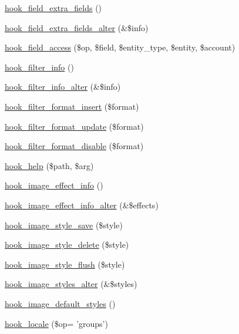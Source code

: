 \begin{DoxyCompactItemize}
\item 
\hyperlink{group__hooks_ga7100332aa5b4d5f6ba72534599d133e5}{hook\_\-field\_\-extra\_\-fields} ()
\item 
\hyperlink{group__hooks_ga88b06596d711f640ebe2f5d3566e7876}{hook\_\-field\_\-extra\_\-fields\_\-alter} (\&\$info)
\item 
\hyperlink{group__hooks_ga9281312bdad448a24f3cfb7e341b36ba}{hook\_\-field\_\-access} (\$op, \$field, \$entity\_\-type, \$entity, \$account)
\item 
\hyperlink{group__hooks_gaf2a2f2a46589420df896a0d42247f15a}{hook\_\-filter\_\-info} ()
\item 
\hyperlink{group__hooks_ga7404a5c9b0c1cfe68383ae528bc8ebd4}{hook\_\-filter\_\-info\_\-alter} (\&\$info)
\item 
\hyperlink{group__hooks_ga3729c44379f4e5298c067795e9aca481}{hook\_\-filter\_\-format\_\-insert} (\$format)
\item 
\hyperlink{group__hooks_gaf9e4490f3ca224c161481754a3332c92}{hook\_\-filter\_\-format\_\-update} (\$format)
\item 
\hyperlink{group__hooks_gae4873bf6d76c33475296917d304719e9}{hook\_\-filter\_\-format\_\-disable} (\$format)
\item 
\hyperlink{group__hooks_ga5589c2714a782738e8851c4c90231f0e}{hook\_\-help} (\$path, \$arg)
\item 
\hyperlink{group__hooks_ga9681816aeb01a316e98457b40a01f8ed}{hook\_\-image\_\-effect\_\-info} ()
\item 
\hyperlink{group__hooks_gaf48ed66489194afdf3e5bce6b3e28768}{hook\_\-image\_\-effect\_\-info\_\-alter} (\&\$effects)
\item 
\hyperlink{group__hooks_gad403dde0a7859e160772ae696ab35cea}{hook\_\-image\_\-style\_\-save} (\$style)
\item 
\hyperlink{group__hooks_ga376a3d4a9427d6a8dad73d68bdd140dc}{hook\_\-image\_\-style\_\-delete} (\$style)
\item 
\hyperlink{group__hooks_gac3c4d53e1323d4e140625e214d3a5f02}{hook\_\-image\_\-style\_\-flush} (\$style)
\item 
\hyperlink{group__hooks_gaf5549b8e546e9484c0de3093b49fea7d}{hook\_\-image\_\-styles\_\-alter} (\&\$styles)
\item 
\hyperlink{group__hooks_ga856096251574b0df42813f6aff0d62ab}{hook\_\-image\_\-default\_\-styles} ()
\item 
\hyperlink{group__hooks_ga7d8968676deb891e4838c2d3173de7f6}{hook\_\-locale} (\$op= 'groups')
\item 

\end{DoxyCompactItemize}
